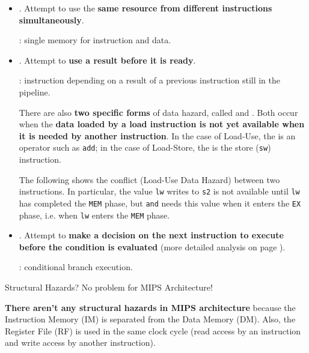 \begin{itemize}
    \item {}. Attempt to use the \textbf{same resource from different instructions simultaneously}.
    
    : single memory for instruction and data.
    

    \item {}. Attempt to \textbf{use a result before it is ready}.
    
    : instruction depending on a result of a previous instruction still in the pipeline.

    There are also \textbf{two specific forms} of data hazard, called  and . Both occur when the \textbf{data loaded by a load instruction is not yet available when it is needed by another instruction}. In the case of Load-Use, the  is an operator such as \texttt{add}; in the case of Load-Store, the  is the store (\texttt{sw}) instruction.

    The following  shows the conflict (Load-Use Data Hazard) between two instructions. In particular, the value \texttt{lw} writes to \texttt{s2} is not available until \texttt{lw} has completed the \texttt{MEM} phase, but \texttt{and} needs this value when it enters the \texttt{EX} phase, i.e. when \texttt{lw} enters the \texttt{MEM} phase.
    

    \item {}. Attempt to \textbf{make a decision on the next instruction to execute before the condition is evaluated} (more detailed analysis on page \pageref{flushleft: how to detect Control Hazards}).
    
    : conditional branch execution.
\end{itemize}

\begin{flushleft}
    Structural Hazards? No problem for MIPS Architecture!
\end{flushleft}
\textbf{There aren't any structural hazards in MIPS architecture} because the Instruction Memory (IM) is separated from the Data Memory (DM). Also, the Register File (RF) is used in the same clock cycle (read access by an instruction and write access by another instruction).

